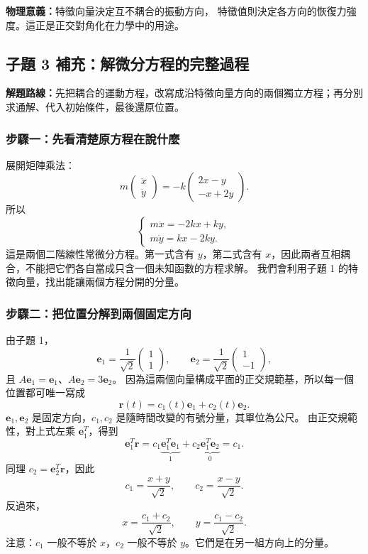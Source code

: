 \documentclass[12pt,a4paper]{article}
\begin{document}
\textbf{物理意義：}特徵向量決定互不耦合的振動方向，
特徵值則決定各方向的恢復力強度。這正是正交對角化在力學中的用途。

\subsection*{子題 3 補充：解微分方程的完整過程}
\textbf{解題路線：}先把耦合的運動方程，改寫成沿特徵向量方向的兩個獨立方程；再分別求通解、代入初始條件，最後還原位置。

\subsubsection*{步驟一：先看清楚原方程在說什麼}
展開矩陣乘法：
\[
    m\begin{pmatrix}\ddot x\\\ddot y\end{pmatrix}
    =-k\begin{pmatrix}2x-y\\-x+2y\end{pmatrix}.
\]
所以
\[
    \begin{cases}
        m\ddot x=-2kx+ky, \\
        m\ddot y=kx-2ky.
    \end{cases}
\]
這是兩個二階線性常微分方程。第一式含有 \(y\)，第二式含有 \(x\)，因此兩者互相耦合，不能把它們各自當成只含一個未知函數的方程求解。
我們會利用子題 1 的特徵向量，找出能讓兩個方程分開的分量。

\subsubsection*{步驟二：把位置分解到兩個固定方向}
由子題 1，
\[
    \mathbf e_1=\frac1{\sqrt2}\begin{pmatrix}1\\1\end{pmatrix},\qquad
    \mathbf e_2=\frac1{\sqrt2}\begin{pmatrix}1\\-1\end{pmatrix},
\]
且 \(A\mathbf e_1=\mathbf e_1\)、\(A\mathbf e_2=3\mathbf e_2\)。
因為這兩個向量構成平面的正交規範基，所以每一個位置都可唯一寫成
\[
    \mathbf r(t)=c_1(t)\mathbf e_1+c_2(t)\mathbf e_2.
\]
\(\mathbf e_1,\mathbf e_2\) 是固定方向，\(c_1,c_2\) 是隨時間改變的有號分量，其單位為公尺。
由正交規範性，對上式左乘 \(\mathbf e_1^T\)，得到
\[
    \mathbf e_1^T\mathbf r
    =c_1\underbrace{\mathbf e_1^T\mathbf e_1}_{1}
    +c_2\underbrace{\mathbf e_1^T\mathbf e_2}_{0}=c_1.
\]
同理 \(c_2=\mathbf e_2^T\mathbf r\)，因此
\[
    \boxed{c_1=\frac{x+y}{\sqrt2},\qquad c_2=\frac{x-y}{\sqrt2}}.
\]
反過來，
\[
    \boxed{x=\frac{c_1+c_2}{\sqrt2},\qquad y=\frac{c_1-c_2}{\sqrt2}}.
\]
注意：\(c_1\) 一般不等於 \(x\)，\(c_2\) 一般不等於 \(y\)。它們是在另一組方向上的分量。
\end{document}
